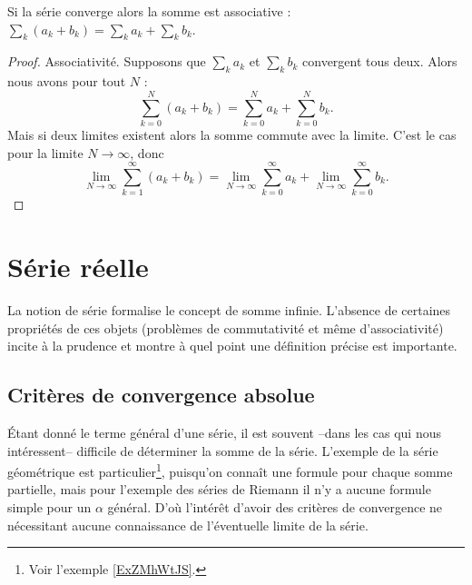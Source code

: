 \begin{proposition}     \label{PROPooUEBWooUQBQvP}
    Si la série converge alors la somme est associative :
    \( \sum_k (a_k+b_k) = \sum_k a_k + \sum_k b_k \).
\end{proposition}

\begin{proof}
    Associativité. Supposons que \( \sum_ka_k\) et \( \sum_kb_k\) convergent tous deux. Alors nous avons pour tout \( N\) :
    \begin{equation}
        \sum_{k=0}^N(a_k+b_k)=\sum_{k=0}^Na_k+\sum_{k=0}^Nb_k.
    \end{equation}
    Mais si deux limites existent alors la somme commute avec la limite. C'est le cas pour la limite \( N\to \infty\), donc
    \begin{equation}
        \lim_{N\to \infty} \sum_{k=1}^{\infty}(a_k+b_k)=\lim_{N\to \infty} \sum_{k=0}^{\infty}a_k+\lim_{N\to \infty} \sum_{k=0}^{\infty}b_k.
    \end{equation}
\end{proof}

\section{Série réelle}
\label{secseries}

La notion de série formalise le concept de somme infinie. L'absence de certaines propriétés de ces objets (problèmes de commutativité et même d'associativité) incite à la prudence et montre à quel point une définition précise est importante.


\subsection{Critères de convergence absolue}

Étant donné le terme général d'une série, il est souvent --dans les cas qui nous intéressent-- difficile de déterminer la somme de la série. L'exemple de la série géométrique est particulier\footnote{Voir l'exemple \ref{ExZMhWtJS}.}, puisqu'on connaît une formule pour chaque somme partielle, mais pour l'exemple des séries de Riemann il n'y a aucune formule simple pour un $\alpha$ général. D'où l'intérêt d'avoir des critères de convergence ne nécessitant aucune connaissance de l'éventuelle limite de la série.

